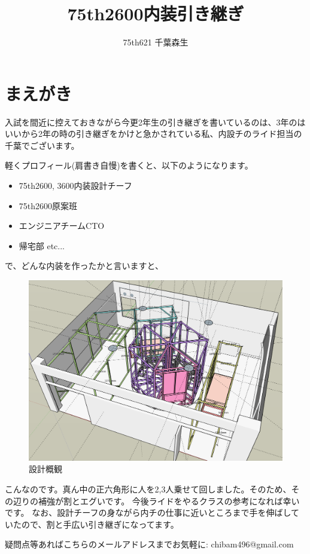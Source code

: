 \documentclass{jsarticle}
\title{75th2600内装引き継ぎ}
\author{75th621 千葉森生}
\begin{document}
\maketitle

\section{まえがき}

入試を間近に控えておきながら今更2年生の引き継ぎを書いているのは、3年のはいいから2年の時の引き継ぎをかけと急かされている私、内設チのライド担当の千葉でございます。

軽くプロフィール(肩書き自慢)を書くと、以下のようになります。
\begin{itemize}
    \item 75th2600, 3600内装設計チーフ
    \item 75th2600原案班
    \item エンジニアチームCTO
    \item 帰宅部 etc...
\end{itemize}

で、どんな内装を作ったかと言いますと、

\begin{figure}
    \centering
    \includegraphics[width=0.8\linewidth]{images/plan_overview/1.png}
    \caption{設計概観}
    \label{fig:設計概観}
\end{figure}

こんなのです。真ん中の正六角形に人を2,3人乗せて回しました。そのため、その辺りの補強が割とエグいです。
今後ライドをやるクラスの参考になれば幸いです。
なお、設計チーフの身ながら内チの仕事に近いところまで手を伸ばしていたので、割と手広い引き継ぎになってます。

疑問点等あればこちらのメールアドレスまでお気軽に:  chibam496@gmail.com
\end{document}
